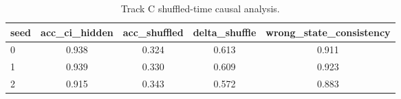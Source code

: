 \begin{table}[t]
\centering
\caption{Track C shuffled-time causal analysis.}
\label{tab:track-c-shuffle}
\footnotesize
\begin{tabular}{lcccc}
\toprule
seed & acc_ci_hidden & acc_shuffled & delta_shuffle & wrong_state_consistency \\
\midrule
0 & 0.938 & 0.324 & 0.613 & 0.911 \\
1 & 0.939 & 0.330 & 0.609 & 0.923 \\
2 & 0.915 & 0.343 & 0.572 & 0.883 \\
\bottomrule
\end{tabular}
\end{table}
